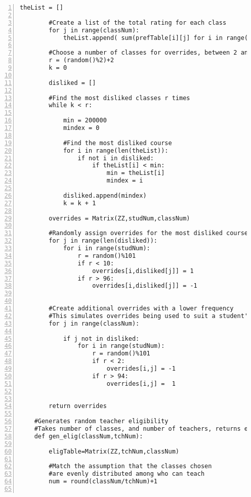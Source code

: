 \documentclass[11pt]{article}
\begin{document}
\begin{lstlisting}[numbers=left,numberstyle=\tiny,numbersep=0pt]
        theList = []
        
        #Create a list of the total rating for each class
        for j in range(classNum):
            theList.append( sum(prefTable[i][j] for i in range(studNum)) )
    
    	#Choose a number of classes for overrides, between 2 and 3
        r = (random()%2)+2
        k = 0
    
        disliked = []
        
        #Find the most disliked classes r times
        while k < r:
        
            min = 200000
            mindex = 0
            
            #Find the most disliked course
            for i in range(len(theList)):
                if not i in disliked:
                    if theList[i] < min:
                        min = theList[i]
                        mindex = i
        
            disliked.append(mindex)
            k = k + 1

        overrides = Matrix(ZZ,studNum,classNum)
        
        #Randomly assign overrides for the most disliked courses
        for j in range(len(disliked)):
            for i in range(studNum):
                r = random()%101
                if r < 10:
                    overrides[i,disliked[j]] = 1
                if r > 96:
                    overrides[i,disliked[j]] = -1
                

    	#Create additional overrides with a lower frequency
    	#This simulates overrides being used to suit a student's tastes
        for j in range(classNum):
        
            if j not in disliked:
                for i in range(studNum):
                    r = random()%101
                    if r < 2:
                        overrides[i,j] = -1
                    if r > 94:
                        overrides[i,j] =  1
    
    
        return overrides
        
    #Generates random teacher eligibility
    #Takes number of classes, and number of teachers, returns eligibility table    
    def gen_elig(classNum,tchNum):
    
        eligTable=Matrix(ZZ,tchNum,classNum)
    
        #Match the assumption that the classes chosen
        #are evenly distributed among who can teach 
        num = round(classNum/tchNum)+1
        

\end{lstlisting}
\end{document}
